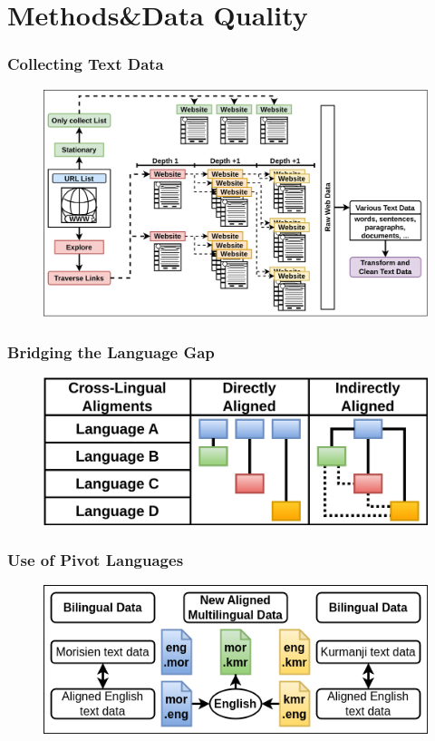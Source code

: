 \documentclass[aspectratio=169]{beamer}
\begin{document}
\section{Methods\&Data Quality}

\begin{frame}[fragile]
	\frametitle{Collecting Text Data}
    \begin{figure}
	    \centering
	    \includegraphics[width=.8\textwidth]{images/CRAMT-Tool-CollectWebdata.png}
	\end{figure}
\end{frame}

\begin{frame}[fragile]
	\frametitle{Bridging the Language Gap}
    \begin{figure}
	    \centering
	    \includegraphics[width=1.0\textwidth]{images/CRAMT-Tool-TextAlignmentsOverviewMulti.png}
	\end{figure}
\end{frame}

\begin{frame}[fragile]
	\frametitle{Use of Pivot Languages}
    \begin{figure}
	    \centering
	    \includegraphics[width=1.0\textwidth]{images/CRAMT-Tool-TextAlignments.png}
	\end{figure}
\end{frame}
\end{document}
